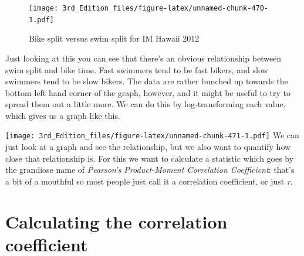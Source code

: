 \documentclass[
]{book}
\newenvironment{Shaded}{\begin{snugshade}}{\end{snugshade}}
\newcommand{\DataTypeTok}[1]{\textcolor[rgb]{0.13,0.29,0.53}{#1}}
\newcommand{\DecValTok}[1]{\textcolor[rgb]{0.00,0.00,0.81}{#1}}
\newcommand{\KeywordTok}[1]{\textcolor[rgb]{0.13,0.29,0.53}{\textbf{#1}}}
\newcommand{\NormalTok}[1]{#1}
\newcommand{\OperatorTok}[1]{\textcolor[rgb]{0.81,0.36,0.00}{\textbf{#1}}}
\newcommand{\StringTok}[1]{\textcolor[rgb]{0.31,0.60,0.02}{#1}}
\begin{document}
\begin{Shaded}
\end{Shaded}

\begin{figure}
\centering
\texttt{[image: 3rd\_Edition\_files/figure-latex/unnamed-chunk-470-1.pdf]}
\caption{\label{fig:unnamed-chunk-470}Bike split versus swim split for IM Hawaii 2012}
\end{figure}

Just looking at this you can see that there's an obvious relationship between swim split and bike time. Fast swimmers tend to be fast bikers, and slow swimmers tend to be slow bikers. The data are rather bunched up towards the bottom left hand corner of the graph, however, and it might be useful to try to spread them out a little more. We can do this by log-transforming each value, which gives us a graph like this.

\begin{Shaded}
\end{Shaded}

\texttt{[image: 3rd\_Edition\_files/figure-latex/unnamed-chunk-471-1.pdf]}
We can just look at a graph and see the relationship, but we also want to quantify how close that relationship is. For this we want to calculate a statistic which goes by the grandiose name of \emph{Pearson's Product-Moment Correlation Coefficient}: that's a bit of a mouthful so most people just call it a correlation coefficient, or just \emph{r}.

\hypertarget{calculating-the-correlation-coefficient}{%
\section{Calculating the correlation coefficient}\label{calculating-the-correlation-coefficient}}
\end{document}

